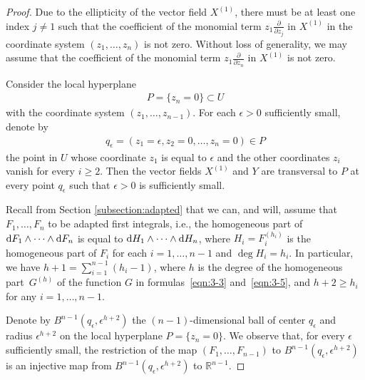 \begin{proof}
Due to the ellipticity of the vector f\/ield $X^{(1)}$, there must be at least
one index $j \neq 1$ such that
the coef\/f\/icient of the monomial term $z_1 \frac{\partial}{\partial z_j}$ in $X^{(1)}$ in the coordinate system $(z_1,\dots, z_n)$ is not zero.
Without loss of generality, we may assume that the coef\/f\/icient of
the monomial term $z_1 \frac{\partial}{\partial z_n}$ in $X^{(1)}$
is not zero.

Consider the local hyperplane
\begin{gather*} P = \{z_n = 0\} \subset U\end{gather*}
with the coordinate system $(z_1,\dots, z_{n-1})$.
For each $\epsilon > 0$ suf\/f\/iciently small, denote by
\begin{gather*} q_{\epsilon} = (z_1= \epsilon, z_2=0,\dots,z_n=0) \in P\end{gather*}
the point in $U$ whose coordinate $z_1$ is equal to $\epsilon$
and the other coordinates $z_i$ vanish for every $i \geq 2$.
Then the vector f\/ields $X^{(1)}$ and $Y$ are transversal to $P$
at every point $q_{\epsilon}$ such that $\epsilon > 0$ is suf\/f\/iciently
small.

Recall from Section \ref{subsection:adapted} that we can, and will,
assume that $F_1,\dots, F_n$ to be adapted f\/irst integrals, i.e.,
the homogeneous part of ${\rm d}F_1 \wedge \dots \wedge {\rm d} F_n$ is equal to
${\rm d}H_1 \wedge \dots \wedge {\rm d} H_n$, where $H_i = F_i^{(h_i)}$ is the homogeneous part
of $F_i$ for each $i=1,\dots, n-1$ and $\deg H_i = h_i$.
In particular, we have
$ h + 1 = \sum\limits_{i=1}^{n-1} (h_i - 1)$,
where $h$ is the degree of the homogeneous part~$G^{(h)}$
of the function $G$ in formulas~\eqref{eqn:3-3} and~\eqref{eqn:3-5},
and $h+2 \geq h_i$ for any $i=1,\dots, n-1$.

Denote by $B^{n-1}(q_\epsilon, \epsilon^{h+2})$ the
$(n-1)$-dimensional ball of center $q_\epsilon$ and radius $\epsilon^{h+2}$
on the local hyperplane $ P = \{z_n = 0\}$. We observe that, for every
$\epsilon $ suf\/f\/iciently small, the restriction of the map
$(F_1,\dots, F_{n-1})$ to $B^{n-1}(q_\epsilon, \epsilon^{h+2})$
is an injective map
from $B^{n-1}(q_\epsilon, \epsilon^{h+2})$ to $\mathbb{R}^{n-1}$.


\end{proof}
